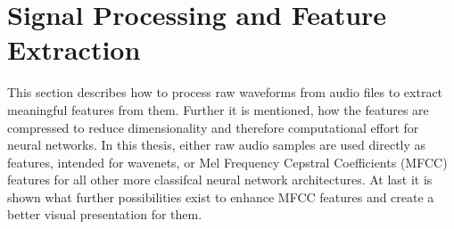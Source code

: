 
\chapter{Signal Processing and Feature Extraction}\label{sec:signal}
This section describes how to process raw waveforms from audio files to extract meaningful features from them.
Further it is mentioned, how the features are compressed to reduce dimensionality and therefore computational effort for neural networks.
In this thesis, either raw audio samples are used directly as features, intended for wavenets, or Mel Frequency Cepstral Coefficients (MFCC) features for all other more classifcal neural network architectures.
At last it is shown what further possibilities exist to enhance MFCC features and create a better visual presentation for them.





